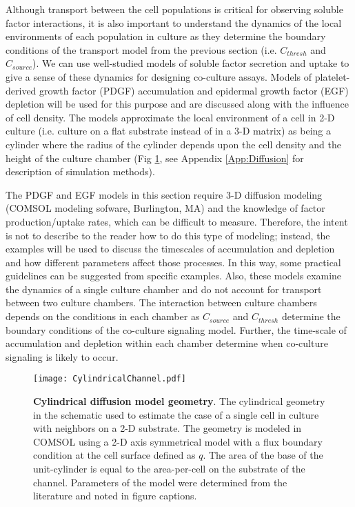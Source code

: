 Although transport between the cell populations is critical for observing soluble factor interactions, it is also important to understand the dynamics of the local environments of each population in culture as they determine the boundary conditions of the transport model from the previous section (i.e. $C_{thresh}$ and $C_{source}$). We can use well-studied models of soluble factor secretion and uptake to give a sense of these dynamics for designing co-culture assays. Models of platelet-derived growth factor (PDGF) accumulation and epidermal growth factor (EGF) depletion will be used for this purpose and are discussed along with the influence of cell density. The models approximate the local environment of a cell in 2-D culture (i.e. culture on a flat substrate instead of in a 3-D matrix) as being a cylinder where the radius of the cylinder depends upon the cell density and the height of the culture chamber (Fig \ref{chap1:fig:diffusionGeom}, see Appendix \ref{App:Diffusion} for description of simulation methods).

The PDGF and EGF models in this section require 3-D diffusion modeling (COMSOL modeling sofware, Burlington, MA) and the knowledge of factor production/uptake rates, which can be difficult to measure. Therefore, the intent is not to describe to the reader how to do this type of modeling; instead, the examples will be used to discuss the timescales of accumulation and depletion and how different parameters affect those processes. In this way, some practical guidelines can be suggested from specific examples. Also, these models examine the dynamics of a single culture chamber and do not account for transport between two culture chambers. The interaction between culture chambers depends on the conditions in each chamber as $C_{source}$ and $C_{thresh}$ determine the boundary conditions of the co-culture signaling model. Further, the time-scale of accumulation and depletion within each chamber determine when co-culture signaling is likely to occur.

\begin{figure}[!t]
\centering
\texttt{[image: CylindricalChannel.pdf]}
\caption{\textbf{Cylindrical diffusion model geometry}. The cylindrical geometry in the schematic used to estimate the case of a single cell in culture with neighbors on a 2-D substrate. The geometry is modeled in COMSOL using a 2-D axis symmetrical model with a flux boundary condition at the cell surface defined as $q$. The area of the base of the unit-cylinder is equal to the area-per-cell on the substrate of the channel. Parameters of the model were determined from the literature and noted in figure captions.}
\label{chap1:fig:diffusionGeom}
\end{figure} 

